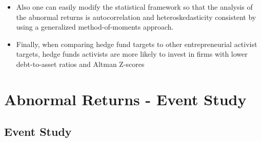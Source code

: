 \documentclass[12pt]{article}
\begin{document}
\begin{itemize}
       \item Also one can easily modify the statistical framework so that the analysis of the abnormal returns is autocorrelation and heteroskedasticity consistent by using a generalized method-of-moments approach.\citep{MacKinlay1997}
       
       \item Finally, when comparing hedge fund targets to other entrepreneurial activist targets, hedge funds activists are more likely to invest in firms with lower debt-to-asset ratios and Altman Z-scores \citep{Klein2009}  
    \end{itemize}



\section{Abnormal Returns - Event Study} 

\subsection{Event Study}
   
\end{document}
